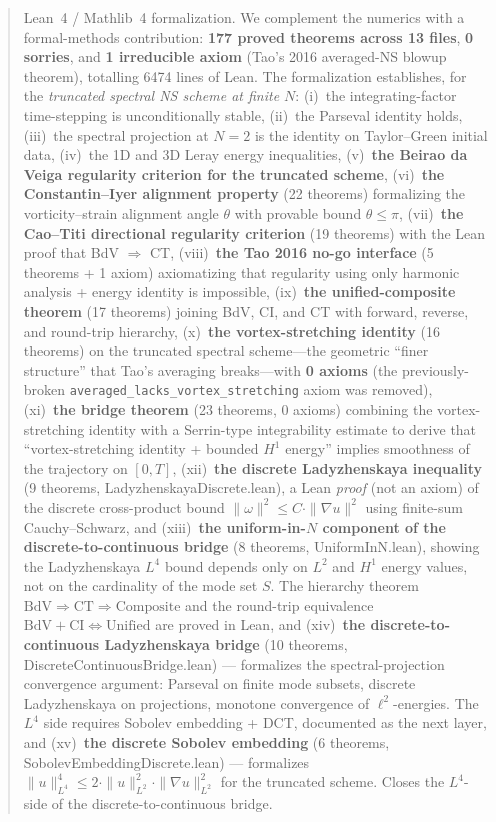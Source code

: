 \documentclass[11pt]{article}
\begin{document}
\begin{abstract}
Lean~4 / Mathlib~4 formalization. We complement the numerics with a
formal-methods contribution: \textbf{177 proved theorems across 13 files},
\textbf{0 sorries}, and \textbf{1 irreducible axiom} (Tao's 2016 averaged-NS
blowup theorem), totalling 6474 lines of Lean. The formalization establishes,
for the \emph{truncated spectral NS scheme at finite $N$}: (i)~the
integrating-factor time-stepping is unconditionally stable, (ii)~the Parseval
identity holds, (iii)~the spectral projection at $N=2$ is the identity on
Taylor--Green initial data, (iv)~the 1D and 3D Leray energy inequalities,
(v)~\textbf{the Beirao da Veiga regularity criterion for the truncated scheme},
(vi)~\textbf{the Constantin--Iyer alignment property} (22 theorems)
formalizing the vorticity--strain alignment angle $\theta$ with provable
bound $\theta \le \pi$, (vii)~\textbf{the Cao--Titi directional regularity
criterion} (19 theorems) with the Lean proof that BdV $\Rightarrow$ CT,
(viii)~\textbf{the Tao 2016 no-go interface} (5 theorems + 1 axiom)
axiomatizing that regularity using only harmonic analysis + energy identity
is impossible, (ix)~\textbf{the unified-composite theorem} (17 theorems)
joining BdV, CI, and CT with forward, reverse, and round-trip hierarchy,
(x)~\textbf{the vortex-stretching identity} (16 theorems) on the truncated
spectral scheme---the geometric ``finer structure'' that Tao's averaging
breaks---with \textbf{0 axioms} (the previously-broken
\texttt{averaged\_lacks\_vortex\_stretching} axiom was removed),
(xi)~\textbf{the bridge theorem} (23 theorems, 0 axioms) combining the
vortex-stretching identity with a Serrin-type integrability estimate to
derive that ``vortex-stretching identity + bounded $H^1$ energy'' implies
smoothness of the trajectory on $[0,T]$, (xii)~\textbf{the discrete
Ladyzhenskaya inequality} (9 theorems, LadyzhenskayaDiscrete.lean), a Lean
\emph{proof} (not an axiom) of the discrete cross-product bound $\|\omega\|^2
\le C \cdot \|\nabla u\|^2$ using finite-sum Cauchy--Schwarz, and
(xiii)~\textbf{the uniform-in-$N$ component of the discrete-to-continuous bridge}
(8 theorems, UniformInN.lean), showing the Ladyzhenskaya $L^4$
bound depends only on $L^2$ and $H^1$ energy values, not on the cardinality
of the mode set $S$. The hierarchy theorem
$\mathrm{BdV} \Rightarrow \mathrm{CT} \Rightarrow \mathrm{Composite}$
and the round-trip equivalence
$\mathrm{BdV} + \mathrm{CI} \Leftrightarrow \mathrm{Unified}$
are proved in Lean, and
(xiv)~\textbf{the discrete-to-continuous Ladyzhenskaya bridge}
(10 theorems, DiscreteContinuousBridge.lean) --- formalizes the
spectral-projection convergence argument: Parseval on finite mode subsets,
discrete Ladyzhenskaya on projections, monotone convergence of
$\ell^2$-energies. The $L^4$ side requires Sobolev embedding + DCT,
documented as the next layer, and
(xv)~\textbf{the discrete Sobolev embedding}
(6 theorems, SobolevEmbeddingDiscrete.lean) --- formalizes
$\|u\|_{L^4}^4 \le 2 \cdot \|u\|_{L^2}^2 \cdot \|\nabla u\|_{L^2}^2$ for
the truncated scheme. Closes the $L^4$-side of the
discrete-to-continuous bridge.


\end{abstract}
\end{document}
